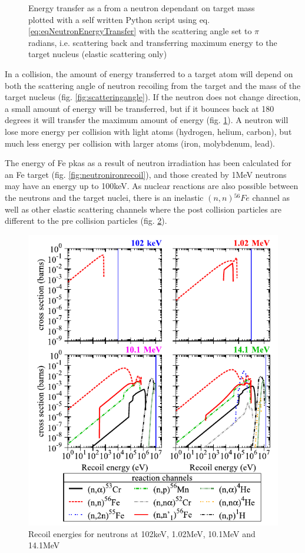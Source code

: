 \begin{figure}
\begin{minipage}{.49\textwidth}
\caption{Energy transfer as a from a neutron dependant on target mass plotted with a self written Python script using eq. \ref{eq:eqNeutronEnergyTransfer}\cite{dosimetrygreening}\cite{duderstadthamilton} with the scattering angle set to $\pi$ radians, i.e. scattering back and transferring maximum energy to the target nucleus (elastic scattering only)}
\label{fig:energytransfer}
\end{minipage}
\end{figure}

In a collision, the amount of energy transferred to a target atom will depend on both the scattering angle of neutron recoiling from the target and the mass of the target nucleus (fig. \ref{fig:scatteringangle}).  If the neutron does not change direction, a small amount of energy will be transferred, but if it bounces back at 180 degrees it will transfer the maximum amount of energy (fig. \ref{fig:energytransfer}).  A neutron will lose more energy per collision with light atoms (hydrogen, helium, carbon), but much less energy per collision with larger atoms (iron, molybdenum, lead).


The energy of Fe \acrshort{pka}s as a result of neutron irradiation has been calculated for an Fe target\cite{pkaenergyspectra} (fig. \ref{fig:neutronironrecoil}), and those created by 1MeV neutrons may have an energy up to 100keV.  As nuclear reactions are also possible between the neutrons and the target nuclei, there is an inelastic $(n,n) {}^{56}Fe$ channel as well as other elastic scattering channels where the post collision particles are different to the pre collision particles (fig. \ref{fig:ferecoilchannels}).

\begin{figure}[ht]
  \begin{center}
    \includegraphics[width=.65\linewidth]{chapters/austenitic_steels_in_nuclear/images/neutronrecoils.png}
    \caption{Recoil energies for neutrons at 102keV, 1.02MeV, 10.1MeV and 14.1MeV\cite{pkaenergyspectra}}
    \label{fig:ferecoilchannels}
  \end{center}
\end{figure}
\FloatBarrier






